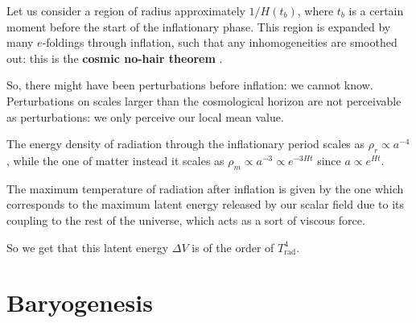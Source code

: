 \documentclass[main.tex]{subfiles}
\begin{document}

Let us consider a region of radius approximately \(1 / H(t_b)\), where \(t_b\) is a certain moment before the start of the inflationary phase.
This region is expanded by many \(e\)-foldings through inflation, such that any inhomogeneities are smoothed out: this is the \textbf{cosmic no-hair theorem} \cite[pag.\ 159]{LucchinColes:2002}.



So, there might have been perturbations before inflation: we cannot know.
Perturbations on scales larger than the cosmological horizon are not perceivable as perturbations: we only perceive our local mean value.


The energy density of radiation through the inflationary period scales as \(\rho _r \propto a^{-4}\), while the one of matter instead it scales as \(\rho _m \propto a^{-3} \propto e^{-3Ht}\) since \(a \propto e^{Ht}\).

The maximum temperature of radiation after inflation is given by the one which corresponds to the maximum latent energy released by our scalar field due to its coupling to the rest of the universe, which acts as a sort of viscous force.

So we get that this latent energy \(\Delta V\) is of the order of \(T^{4}_{\text{rad}}\).

\section{Baryogenesis}
\end{document}

